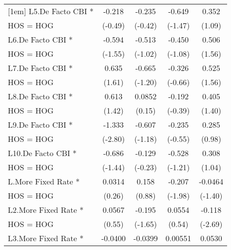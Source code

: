 {\begin{tabular}{l*{4}{c}}
[1em]
L5.De Facto CBI *   &      -0.218         &      -0.235         &      -0.649         &       0.352         \\
HOS = HOG           &     (-0.49)         &     (-0.42)         &     (-1.47)         &      (1.09)         \\
[1em]
L6.De Facto CBI *   &      -0.594         &      -0.513         &      -0.450         &       0.506         \\
HOS = HOG           &     (-1.55)         &     (-1.02)         &     (-1.08)         &      (1.56)         \\
[1em]
L7.De Facto CBI *   &       0.635         &      -0.665         &      -0.326         &       0.525         \\
HOS = HOG           &      (1.61)         &     (-1.20)         &     (-0.66)         &      (1.56)         \\
[1em]
L8.De Facto CBI *   &       0.613         &      0.0852         &      -0.192         &       0.405         \\
HOS = HOG           &      (1.42)         &      (0.15)         &     (-0.39)         &      (1.40)         \\
[1em]
L9.De Facto CBI *   &      -1.333\sym{**} &      -0.607         &      -0.235         &       0.285         \\
HOS = HOG           &     (-2.80)         &     (-1.18)         &     (-0.55)         &      (0.98)         \\
[1em]
L10.De Facto CBI *  &      -0.686         &      -0.129         &      -0.528         &       0.308         \\
HOS = HOG           &     (-1.44)         &     (-0.23)         &     (-1.21)         &      (1.04)         \\
[1em]
L.More Fixed Rate * &      0.0314         &       0.158         &      -0.207\sym{*}  &     -0.0464         \\
HOS = HOG           &      (0.26)         &      (0.88)         &     (-1.98)         &     (-1.40)         \\
[1em]
L2.More Fixed Rate *&      0.0567         &      -0.195         &      0.0554         &      -0.118\sym{**} \\
HOS = HOG           &      (0.55)         &     (-1.65)         &      (0.54)         &     (-2.69)         \\
[1em]
L3.More Fixed Rate *&     -0.0400         &     -0.0399         &     0.00551         &      0.0530         \\

\end{tabular}}
